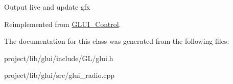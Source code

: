 Output live and update gfx 

Reimplemented from \hyperlink{classGLUI__Control}{G\-L\-U\-I\-\_\-\-Control}.



The documentation for this class was generated from the following files\-:\begin{DoxyCompactItemize}
\item 
project/lib/glui/include/\-G\-L/glui.\-h\item 
project/lib/glui/src/glui\-\_\-radio.\-cpp\end{DoxyCompactItemize}
